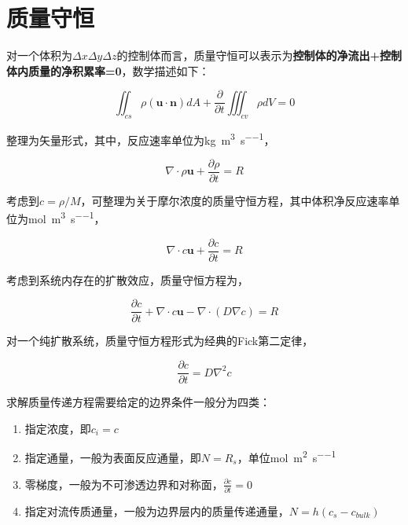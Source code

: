 \section{质量守恒}

对一个体积为$ \Delta x \Delta y \Delta z $的控制体而言，质量守恒可以表示为\textbf{控制体的净流出+控制体内质量的净积累率=0}，数学描述如下：

\begin{equation}
\iint_{cs} \rho(\bm{u\cdot n})dA + \frac{\partial }{\partial t} \iiint_{cv}\rho dV = 0
\end{equation}

整理为矢量形式，其中，反应速率单位为\si{\kg\per\meter\cubed\per\second}，

\begin{equation}
\nabla \cdot \rho\mathbf{u} + \frac{\partial \rho}{\partial t} = R
\end{equation}

考虑到$ c=\rho/M $，可整理为关于摩尔浓度的质量守恒方程，其中体积净反应速率单位为\si{\mole\per\meter\cubed\per\second}，

\begin{equation}
\nabla \cdot c\mathbf{u} + \frac{\partial c}{\partial t} = R
\end{equation}

考虑到系统内存在的扩散效应，质量守恒方程为，

\begin{equation}
\frac{\partial c}{\partial t} + \nabla \cdot c\mathbf{u} - \nabla\cdot(D\nabla c) = R
\end{equation}

对一个纯扩散系统，质量守恒方程形式为经典的Fick第二定律，

\begin{equation}
\frac{\partial c}{\partial t} = D\nabla^2 c
\end{equation}

求解质量传递方程需要给定的边界条件一般分为四类：

\begin{enumerate}
\item 指定浓度，即$ c_i = c $
\item 指定通量，一般为表面反应通量，即$ N=R_s $，单位\si{\mole\per\meter\squared\per\second}
\item 零梯度，一般为不可渗透边界和对称面，$ \frac{\partial c}{\partial t}=0 $
\item 指定对流传质通量，一般为边界层内的质量传递通量，$ N=h(c_s-c_{bulk} ) $
\end{enumerate}


